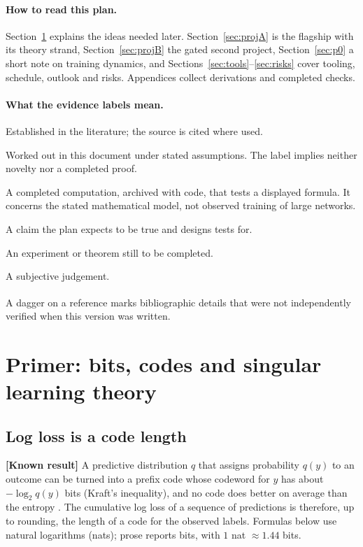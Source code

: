 \documentclass[11pt,a4paper]{article}
\newcommand{\unv}{\textsuperscript{\dag}}
\newcommand{\evl}[2]{{\small\bfseries\color{#1}[#2]}}
\newcommand{\LKnown}{\evl{cknown}{Known result}}
\newcommand{\LCalc}{\evl{ccalc}{Internal calculation}}
\newcommand{\LNum}{\evl{cnum}{Numerical check}}
\newcommand{\LHyp}{\evl{chyp}{Hypothesis}}
\newcommand{\LTest}{\evl{ctest}{Proposed test}}
\newcommand{\LAssess}{\evl{cassess}{Assessment}}
\begin{document}
\paragraph{How to read this plan.} Section~\ref{sec:primer} explains the
ideas needed later. Section~\ref{sec:projA} is the flagship with its theory
strand, Section~\ref{sec:projB} the gated second project,
Section~\ref{sec:p0} a short note on training dynamics, and
Sections~\ref{sec:tools}--\ref{sec:risks} cover tooling, schedule, outlook
and risks. Appendices collect derivations and completed checks.

\paragraph{What the evidence labels mean.}
\begin{description}[style=nextline,leftmargin=1.5em]
\item[\LKnown] Established in the literature; the source is cited where
used.
\item[\LCalc] Worked out in this document under stated assumptions. The
label implies neither novelty nor a completed proof.
\item[\LNum] A completed computation, archived with code, that tests a
displayed formula. It concerns the stated mathematical model, not observed
training of large networks.
\item[\LHyp] A claim the plan expects to be true and designs tests for.
\item[\LTest] An experiment or theorem still to be completed.
\item[\LAssess] A subjective judgement.
\end{description}
\noindent A dagger\unv{} on a reference marks bibliographic details that
were not independently verified when this version was written.

\section{Primer: bits, codes and singular learning theory}
\label{sec:primer}

\subsection{Log loss is a code length}

\LKnown{} A predictive distribution $q$ that assigns probability $q(y)$
to an outcome can be turned into a prefix code whose codeword for $y$
has about $-\log_2 q(y)$ bits (Kraft's inequality), and no code does
better on average than the entropy \cite{grunwald2007}. The cumulative
log loss of a sequence of predictions is therefore, up to rounding, the
length of a code for the observed labels. Formulas below use natural
logarithms (nats); prose reports bits, with $1$ nat $\approx 1.44$ bits.
\end{document}
